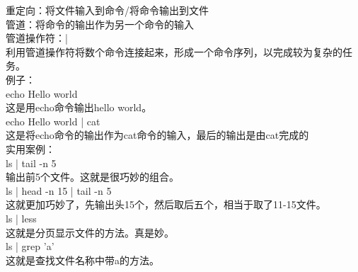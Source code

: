 \documentclass{article}
\begin{document}
\noindent
重定向：将文件输入到命令/将命令输出到文件\\
管道：将命令的输出作为另一个命令的输入\\
管道操作符：|\\
利用管道操作符将数个命令连接起来，形成一个命令序列，以完成较为复杂的任务。\\

\noindent
例子：\\
echo Hello world\\
这是用echo命令输出hello world。\\
echo Hello world | cat\\
这是将echo命令的输出作为cat命令的输入，最后的输出是由cat完成的\\
实用案例：\\
ls | tail -n 5\\
输出前5个文件。这就是很巧妙的组合。\\
ls | head -n 15 | tail -n 5\\
这就更加巧妙了，先输出头15个，然后取后五个，相当于取了11-15文件。\\
ls | less\\
这就是分页显示文件的方法。真是妙。\\
ls | grep 'a'\\
这就是查找文件名称中带a的方法。\\
\end{document}
